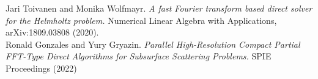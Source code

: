 \documentclass[handout]{beamer}
\begin{document}
\begin{frame}
\begin{thebibliography}{9}




{Jari Toivanen and Monika Wolfmayr.}
\textit{A fast Fourier transform based direct solver for the Helmholtz problem.}
{Numerical Linear Algebra with Applications, arXiv:1809.03808 (2020).}\\


{Ronald Gonzales and Yury Gryazin.}
\textit{Parallel High-Resolution Compact Partial FFT-Type Direct Algorithms for Subsurface Scattering Problems.}
{SPIE Proceedings (2022)}


\end{thebibliography}
\end{frame}








 
\end{document}
